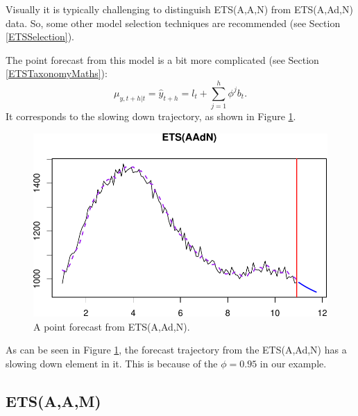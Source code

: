 \documentclass[
]{book}
\theoremstyle{definition}
\theoremstyle{definition}
\theoremstyle{definition}
\theoremstyle{definition}
\theoremstyle{remark}
\begin{document}
Visually it is typically challenging to distinguish ETS(A,A,N) from ETS(A,Ad,N) data. So, some other model selection techniques are recommended (see Section \ref{ETSSelection}).

The point forecast from this model is a bit more complicated (see Section \ref{ETSTaxonomyMaths}):
\begin{equation}
    \mu_{y,t+h|t} = \hat{y}_{t+h} = l_{t} + \sum_{j=1}^h \phi^j b_t.
  \label{eq:ETSAAdNForecast}
\end{equation}
It corresponds to the slowing down trajectory, as shown in Figure \ref{fig:ETSAAdNExampleForecast}.

\begin{figure}
\centering
\includegraphics{Svetunkov--2022----ADAM_files/figure-latex/ETSAAdNExampleForecast-1.pdf}
\caption{\label{fig:ETSAAdNExampleForecast}A point forecast from ETS(A,Ad,N).}
\end{figure}

As can be seen in Figure \ref{fig:ETSAAdNExampleForecast}, the forecast trajectory from the ETS(A,Ad,N) has a slowing down element in it. This is because of the \(\phi=0.95\) in our example.

\hypertarget{ETSAAMModel}{%
\subsection{ETS(A,A,M)}\label{ETSAAMModel}}
\end{document}

